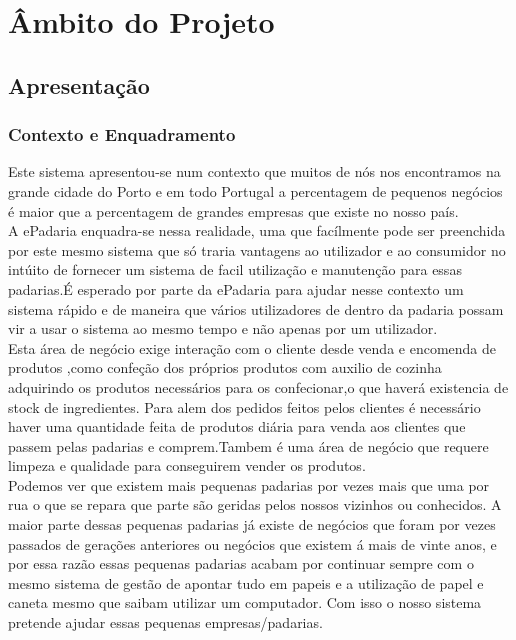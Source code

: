 \chapter{Âmbito do Projeto}
\label{ambito}
\section{Apresentação}
\subsection{Contexto e Enquadramento}
Este sistema apresentou-se num contexto que muitos de nós nos encontramos na grande cidade do Porto e em todo Portugal a percentagem de pequenos negócios é maior que a percentagem de grandes empresas que existe no nosso país.\\
A ePadaria enquadra-se nessa realidade, uma que facílmente pode ser preenchida por este mesmo sistema que só traria vantagens ao utilizador e ao consumidor no intúito de fornecer um sistema de facil utilização e manutenção para essas padarias.É esperado por parte da ePadaria para ajudar nesse contexto um sistema rápido e de maneira que vários utilizadores de dentro da padaria possam vir a usar o sistema ao mesmo tempo e não apenas por um utilizador. \\
Esta área de negócio  exige interação com o cliente desde venda e encomenda de produtos ,como confeção dos próprios produtos com auxilio de cozinha  adquirindo os produtos necessários para os confecionar,o que haverá existencia de stock de ingredientes. Para alem dos pedidos feitos pelos clientes é necessário haver uma quantidade feita de produtos diária para venda aos clientes que passem pelas padarias e comprem.Tambem é uma área de negócio que requere limpeza e qualidade para conseguirem vender os produtos.\\
 Podemos ver que existem mais pequenas padarias por vezes mais que uma por rua o que se repara que parte são geridas pelos nossos vizinhos ou conhecidos. A maior parte dessas pequenas padarias já existe de negócios que foram por vezes passados de gerações anteriores ou negócios que existem á mais de vinte anos, e por essa razão essas pequenas padarias acabam por continuar sempre com o mesmo sistema de gestão de apontar tudo em papeis e a utilização de papel e caneta mesmo que saibam utilizar um computador. Com isso o nosso sistema pretende ajudar essas pequenas empresas/padarias.\\




